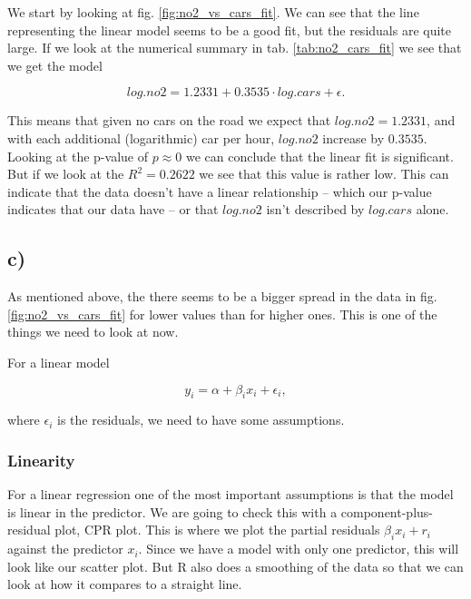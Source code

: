 \documentclass[a4paper,norsk, 10pt]{article}
\begin{document}
We start by looking at fig. \ref{fig:no2_vs_cars_fit}. We can see that the line representing the linear model seems to be a good fit, but the residuals are quite large. If we look at the numerical summary in tab. \ref{tab:no2_cars_fit} we see that we get the model

\begin{equation}
log.no2 = 1.2331 + 0.3535\cdot log.cars + \epsilon.
\end{equation}

This means that given no cars on the road we expect that $log.no2 = 1.2331$, and with each additional (logarithmic) car per hour, $log.no2$ increase by $0.3535$. Looking at the p-value of $p \approx 0$ we can conclude that the linear fit is significant. But if we look at the $R^2 = 0.2622$ we see that this value is rather low. This can indicate that the data doesn't have a linear relationship -- which our p-value indicates that our data have -- or that $log.no2$ isn't described by $log.cars$ alone.


\subsection*{c)}\label{sec:c}
As mentioned above, the there seems to be a bigger spread in the data in fig. \ref{fig:no2_vs_cars_fit} for lower values than for higher ones. This is one of the things we need to look at now. 

For a linear model

\begin{equation}
y_i = \alpha + \beta_i x_i + \epsilon_i,
\end{equation}

where $\epsilon_i$ is the residuals, we need to have some assumptions.


\subsubsection*{Linearity}
For a linear regression one of the most important assumptions is that the model is linear in the predictor. We are going to check this with a  component-plus-residual plot, CPR plot. This is where we plot the partial residuals $\beta_i x_i + r_i$ against the predictor $x_i$. Since we have a model with only one predictor, this will look like our scatter plot. But R also does a smoothing of the data so that we can look at how it compares to a straight line.
\end{document}
